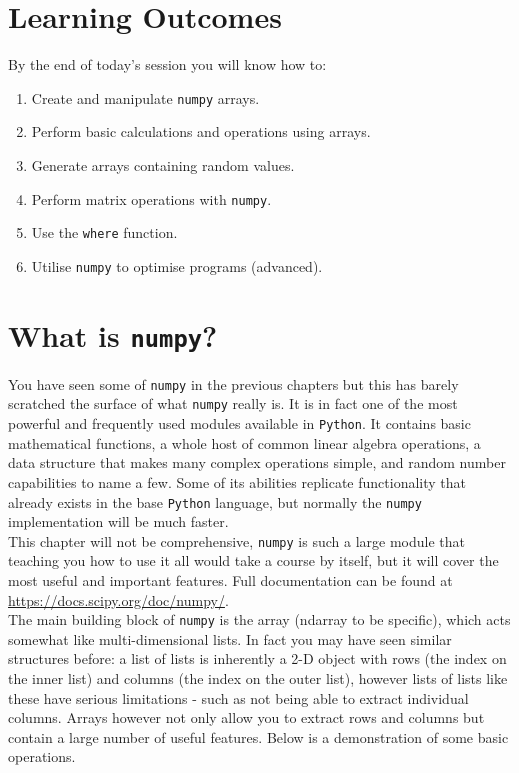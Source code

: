 \section{Learning Outcomes}

\noindent By the end of today's session you will know how to:
\begin{enumerate} 
\item Create and manipulate \texttt{numpy} arrays.
\item Perform basic calculations and operations using arrays.
\item Generate arrays containing random values.
\item Perform matrix operations with \texttt{numpy}.
\item Use the \texttt{where} function.
\item Utilise \texttt{numpy} to optimise programs (advanced).
\end{enumerate}

\section{What is \texttt{numpy}?}

You have seen some of \texttt{numpy} in the previous chapters but this has barely scratched the surface of what \texttt{numpy} really is. It is in fact one of the most powerful and frequently used modules available in \texttt{Python}. It contains basic mathematical functions, a whole host of common linear algebra operations, a data structure that makes many complex operations simple, and random number capabilities to name a few. Some of its abilities replicate functionality that already exists in the base \texttt{Python} language, but normally the \texttt{numpy} implementation will be much faster. \\

This chapter will not be comprehensive, \texttt{numpy} is such a large module that teaching you how to use it all would take a course by itself, but it will cover the most useful and important features. Full documentation can be found at \url{https://docs.scipy.org/doc/numpy/}.\\

The main building block of \texttt{numpy} is the array (ndarray to be specific), which acts somewhat like multi-dimensional lists. In fact you may have seen similar structures before: a list of lists is inherently a 2-D object with rows (the index on the inner list) and columns (the index on the outer list), however lists of lists like these have serious limitations - such as not being able to extract individual columns. Arrays however not only allow you to extract rows and columns but contain a large number of useful features. Below is a demonstration of some basic operations. \\

